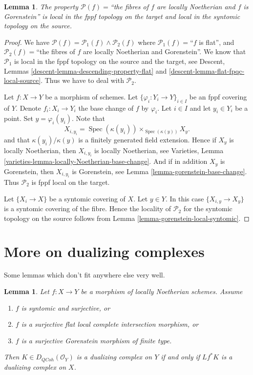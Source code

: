 \documentclass{stacks-project}
\theoremstyle{plain}
\newtheorem{lemma}[subsection]{Lemma}
\theoremstyle{definition}
\theoremstyle{remark}
\numberwithin{equation}{subsection}
\def\Spec{\mathop{\mathrm{Spec}}}
\def\QCoh{\mathit{QCoh}}
\begin{document}
\begin{lemma}
\label{lemma-gorenstein-local-source-and-target}
The property
$\mathcal{P}(f)=$``the fibres of $f$ are locally Noetherian and $f$ is
Gorenstein'' is local in the fppf topology on the target and
local in the syntomic topology on the source.
\end{lemma}

\begin{proof}
We have
$\mathcal{P}(f) =
\mathcal{P}_1(f) \wedge \mathcal{P}_2(f)$
where
$\mathcal{P}_1(f)=$``$f$ is flat'', and
$\mathcal{P}_2(f)=$``the fibres of $f$ are locally Noetherian
and Gorenstein''.
We know that $\mathcal{P}_1$ is
local in the fppf topology on the source and the target, see
Descent, Lemmas \ref{descent-lemma-descending-property-flat} and
\ref{descent-lemma-flat-fpqc-local-source}. Thus we have to deal
with $\mathcal{P}_2$.

\medskip\noindent
Let $f : X \to Y$ be a morphism of schemes.
Let $\{\varphi_i : Y_i \to Y\}_{i \in I}$ be an fppf covering of $Y$.
Denote $f_i : X_i \to Y_i$ the base change of $f$ by $\varphi_i$.
Let $i \in I$ and let $y_i \in Y_i$ be a point.
Set $y = \varphi_i(y_i)$. Note that
$$
X_{i, y_i} = \Spec(\kappa(y_i)) \times_{\Spec(\kappa(y))} X_y.
$$
and that $\kappa(y_i)/\kappa(y)$ is a finitely generated field
extension. Hence if $X_y$ is locally Noetherian, then
$X_{i, y_i}$ is locally Noetherian, see
Varieties, Lemma \ref{varieties-lemma-locally-Noetherian-base-change}.
And if in addition $X_y$ is Gorenstein,
then $X_{i, y_i}$ is Gorenstein, see
Lemma \ref{lemma-gorenstein-base-change}.
Thus $\mathcal{P}_2$ is fppf local on the target.

\medskip\noindent
Let $\{X_i \to X\}$ be a syntomic covering of $X$.
Let $y \in Y$. In this case $\{X_{i, y} \to X_y\}$ is a
syntomic covering of the fibre. Hence the locality of $\mathcal{P}_2$
for the syntomic topology on the source follows from
Lemma \ref{lemma-gorenstein-local-syntomic}.
\end{proof}




\section{More on dualizing complexes}
\label{section-more-dualizing}

\noindent
Some lemmas which don't fit anywhere else very well.

\begin{lemma}
\label{lemma-descent-ascent}
Let $f : X \to Y$ be a morphism of locally Noetherian schemes. Assume
\begin{enumerate}
\item $f$ is syntomic and surjective, or
\item $f$ is a surjective flat local complete intersection morphism, or
\item $f$ is a surjective Gorenstein morphism of finite type.
\end{enumerate}
Then $K \in D_\QCoh(\mathcal{O}_Y)$ is a dualizing complex on $Y$ if and only
if $Lf^*K$ is a dualizing complex on $X$.
\end{lemma}
\end{document}
